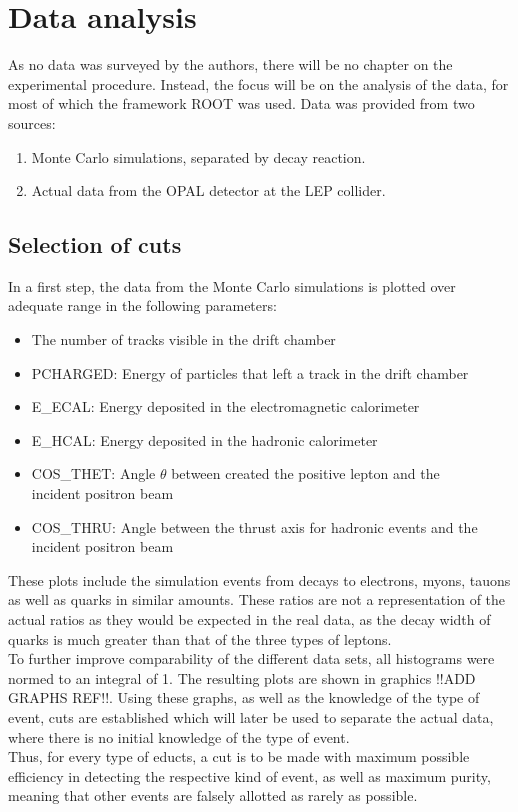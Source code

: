 \section{Data analysis}
As no data was surveyed by the authors, there will be no chapter on the experimental procedure. Instead, the focus will be on the analysis of the data, for most of which the framework ROOT was used. Data was provided from two sources:
\begin{enumerate}
	\item Monte Carlo simulations, separated by decay reaction.
	\item Actual data from the OPAL detector at the LEP collider.
\end{enumerate}


\subsection{Selection of cuts}
In a first step, the data from the Monte Carlo simulations is plotted over adequate range in the following parameters:
\begin{itemize}
	\item{} The number of tracks visible in the drift chamber
	\item PCHARGED: Energy of particles that left a track in the drift chamber
	\item E\_ECAL: Energy deposited in the electromagnetic calorimeter
	\item E\_HCAL: Energy deposited in the hadronic calorimeter
	\item COS\_THET: Angle $\theta$ between created the positive lepton and the \\incident positron beam
	\item COS\_THRU: Angle between the thrust axis for hadronic events and the \\incident positron beam
\end{itemize}
These plots include the simulation events from decays to electrons, myons, tauons as well as quarks in similar amounts. These ratios are not a representation of the actual ratios as they would be expected in the real data, as the decay width of quarks is much greater than that of the three types of leptons. \\
To further improve comparability of the different data sets, all histograms were normed to an integral of 1. The resulting plots are shown in graphics !!ADD GRAPHS REF!!. Using these graphs, as well as the knowledge of the type of event, cuts are established which will later be used to separate the actual data, where there is no initial knowledge of the type of event.\\
Thus, for every type of educts, a cut is to be made with maximum possible efficiency in detecting the respective kind of event, as well as maximum purity, meaning that other events are falsely allotted as rarely as possible.

